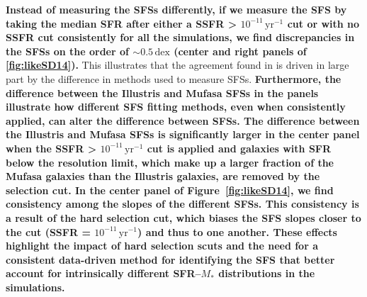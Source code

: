 \documentclass[tighten, preprint]{aastex62}
\begin{document}
{\bf \color{red} Instead of measuring the SFSs differently, if we measure the SFS 
by taking the median SFR after either a SSFR > $10^{-11}\, \mathrm{yr}^{-1}$ cut 
or  with no SSFR cut consistently for all the  simulations, we find discrepancies 
in the SFSs on the order of ${\sim}0.5\,\mathrm{dex}$ (center and right panels of \ref{fig:likeSD14}).
} 
This illustrates that the agreement found in 
\cite{somerville2015} is driven in large part by the difference in methods used to 
measure SFSs. 
{\bf \color{red}
Furthermore, the difference between the Illustris and {\sc Mufasa} SFSs in 
the panels illustrate how different SFS fitting methods, even when 
consistently applied, can alter the difference between SFSs. The difference 
between the Illustris and {\sc Mufasa} SFSs is significantly larger in the 
center panel when the SSFR > $10^{-11}\, \mathrm{yr}^{-1}$ cut is applied and 
galaxies with SFR below the resolution limit, which make up a larger fraction of the {\sc Mufasa} 
galaxies than the Illustris galaxies, are removed by the selection cut. In 
the center panel of Figure~\ref{fig:likeSD14}, we find consistency among the
slopes of the different SFSs. This consistency is a result of the hard selection 
cut, which biases the SFS slopes closer to the cut (SSFR = $10^{-11}\, \mathrm{yr}^{-1}$)
and thus to one another. These effects highlight the impact of hard selection scuts 
and the need for a consistent data-driven method for identifying the SFS that 
better account for intrinsically different SFR--$M_*$ distributions in the simulations.} 

\end{document}
